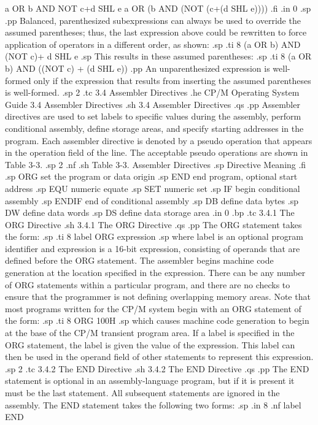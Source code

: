 a OR b AND NOT c+d SHL e    a OR (b AND (NOT (c+(d SHL e))))
.fi
.in 0
.sp 
.pp
Balanced, parenthesized subexpressions can always be used to 
override the assumed parentheses; thus, the last expression above 
could be rewritten to force application of operators in a 
different order, as shown:
.sp
.ti 8
(a OR b) AND (NOT c)+ d SHL e
.sp
This results in these assumed parentheses:
.sp
.ti 8
(a OR b) AND ((NOT c) + (d SHL e))
.pp
An unparenthesized expression is well-formed only if the 
expression that results from inserting the assumed parentheses is 
well-formed.
.sp 2
.tc    3.4  Assembler Directives
.he CP/M Operating System Guide             3.4  Assembler Directives
.sh
3.4  Assembler Directives
.qs
.pp
Assembler directives are used to set labels to specific values 
during the assembly, perform conditional assembly, define storage 
areas, and specify starting addresses in the program.  Each 
assembler directive is denoted by a pseudo operation that appears 
in the operation field of the line.  The acceptable pseudo operations 
are shown in Table 3-3.
.sp 2
.nf
.sh
                Table 3-3.  Assembler Directives
.sp
        Directive                 Meaning
.fi
.sp
          ORG       set the program or data origin
.sp
          END       end program, optional start address
.sp
          EQU       numeric equate
.sp
          SET       numeric set
.sp
          IF        begin conditional assembly
.sp
          ENDIF     end of conditional assembly
.sp
          DB        define data bytes
.sp
          DW        define data words
.sp
          DS        define data storage area
.in 0
.bp
.tc         3.4.1  The ORG Directive
.sh
3.4.1  The ORG Directive
.qs
.pp
The ORG statement takes the form:
.sp
.ti 8
label  ORG  expression
.sp
where label is an optional program identifier and expression is 
a 16-bit expression, consisting of operands that are defined 
before the ORG statement.  The assembler begins machine code 
generation at the location specified in the expression.  There 
can be any number of ORG statements within a particular program, 
and there are no checks to ensure that the programmer is not 
defining overlapping memory areas.  Note that 
most programs written for the CP/M system begin with an ORG 
statement of the form:
.sp
.ti 8
ORG  100H
.sp
which causes machine code generation to begin at the base of the 
CP/M transient program area.  If a label is specified in the ORG 
statement, the label is given the value of the expression.  This 
label can then be used in the operand field of other statements 
to represent this expression.
.sp 2
.tc         3.4.2  The END Directive
.sh
3.4.2  The END Directive
.qs
.pp
The END statement is optional in an assembly-language program, 
but if it is present it must be the last statement.  All 
subsequent statements are ignored in the assembly.  The END 
statement takes the following two forms: 
.sp 
.in 8
.nf
label END

